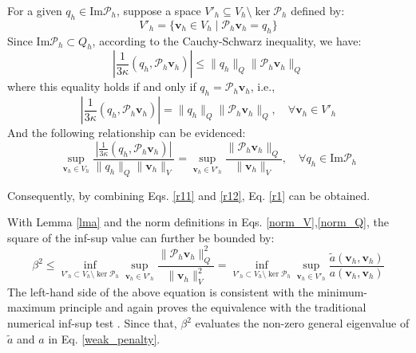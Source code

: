 \begin{pf}
For a given $q_h \in \mathrm{Im} \mathcal{P}_h$, suppose a space $V'_h \subseteq V_h \setminus \ker \mathcal{P}_h$ defined by:
\begin{equation}
V'_h = \{\boldsymbol{v}_h \in V_h \mid \mathcal{P}_h \boldsymbol{v}_h = q_h\}
\end{equation}
Since $\mathrm{Im} \mathcal{P}_h \subset Q_h$, according to the Cauchy-Schwarz inequality, we have:
\begin{equation}
\left| \frac{1}{3\kappa} (q_h, \mathcal{P}_h \boldsymbol{v}_h) \right| \le \|q_h\|_Q \|\mathcal{P}_h \boldsymbol{v}_h\|_Q
\end{equation}
where this equality holds if and only if $q_h = \mathcal{P}_h \boldsymbol{v}_h$, i.e.,
\begin{equation}
\left| \frac{1}{3\kappa} (q_h, \mathcal{P}_h \boldsymbol{v}_h) \right| = \|q_h\|_Q \|\mathcal{P}_h \boldsymbol{v}_h\|_Q, \quad \forall \boldsymbol{v}_h \in V'_h
\end{equation}
And the following relationship can be evidenced:
\begin{equation}\label{r12}
\sup_{\boldsymbol{v}_h \in V_h} \frac{\left| \frac{1}{3\kappa} (q_h, \mathcal{P}_h \boldsymbol{v}_h) \right|}{\|q_h\|_Q \|\boldsymbol{v}_h\|_V} = \sup_{\boldsymbol{v}_h \in V'_h} \frac{\|\mathcal{P}_h \boldsymbol{v}_h\|_Q}{\|\boldsymbol{v}_h\|_V}, \quad \forall q_h \in \mathrm{Im} \mathcal{P}_h
\end{equation}

Consequently, by combining Eqs. \eqref{r11} and \eqref{r12}, Eq. \eqref{r1} can be obtained.
\end{pf}

\begin{rmk}
With Lemma \ref{lma} and the norm definitions in Eqs. \eqref{norm_V},\eqref{norm_Q}, the square of the inf-sup value can further be bounded by:
\begin{equation}
\beta^2 \le \inf_{V'_h \subset V_h \setminus \ker \mathcal{P}_h} \sup_{\boldsymbol{v}_h \in V'_h} \frac{\|\mathcal{P}_h \boldsymbol{v}_h\|_Q^2}{\|\boldsymbol{v}_h\|_V^2} = \inf_{V'_h \subset V_h \setminus \ker \mathcal{P}_h} \sup_{\boldsymbol{v}_h \in V'_h} \frac{\tilde{a}(\boldsymbol{v}_h, \boldsymbol{v}_h)}{a(\boldsymbol{v}_h, \boldsymbol{v}_h)}
\end{equation}
The left-hand side of the above equation is consistent with the minimum-maximum principle \cite{babuska1991} and again proves the equivalence with the traditional numerical inf-sup test \cite{malkus1981}. Since that, $\beta^2$ evaluates the non-zero general eigenvalue of $\tilde{a}$ and $a$ in Eq. \eqref{weak_penalty}.
\end{rmk}

